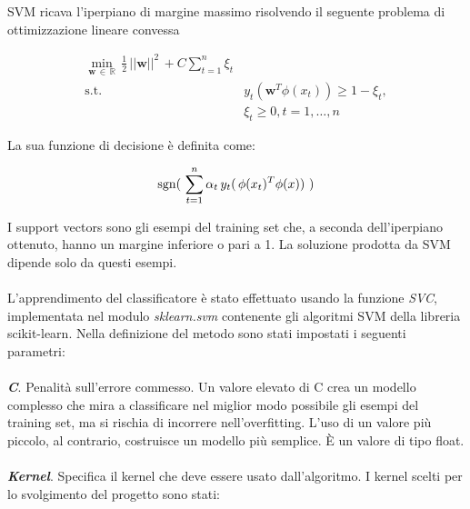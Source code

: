 SVM ricava l'iperpiano di margine massimo risolvendo il seguente problema di ottimizzazione lineare convessa

\begin{equation} \label{uno}
\begin{split}
\min_ { \boldsymbol{w} \, \in \, \mathbb{R}} \, \frac{1}{2} \, ||\boldsymbol{w}||^2 \, + C \sum_{t=1}^{n} \xi_t \\
\textrm {s.t. } & y_t (\boldsymbol{w}^T \phi (x_t)) \geq 1 - \xi_t, \\
& \xi_t \geq 0, t=1, \dotsc ,n
\end{split}
\end{equation}

La sua funzione di decisione è definita come:

\begin{equation} \label{due}
\operatorname*{sgn}( \, \, \sum_{t=1}^n \alpha_t \, y_t ( \, \phi (x_t)^T \phi (x)) \, \,)
\end{equation}

I support vectors sono gli esempi del training set che, a seconda dell'iperpiano ottenuto, hanno un margine inferiore o pari a 1. La soluzione prodotta da SVM dipende solo da questi esempi.

\paragraph*{}
L'apprendimento del classificatore è stato effettuato usando la funzione \textit{SVC}, implementata nel modulo \textit{sklearn.svm} contenente gli algoritmi SVM della libreria scikit-learn. Nella definizione del metodo sono stati impostati i seguenti parametri:

\paragraph*{}
\textbf{\textit{C}}. Penalità sull'errore commesso. Un valore elevato di C crea un modello complesso che mira a classificare nel miglior modo possibile gli esempi del training set, ma si rischia di incorrere nell'overfitting. L'uso di un valore più piccolo, al contrario, costruisce un modello più semplice. È un valore di tipo float. 

\paragraph*{}
\textbf{\textit{Kernel}}. Specifica il kernel che deve essere usato dall'algoritmo. I kernel scelti per lo svolgimento del progetto sono stati:

